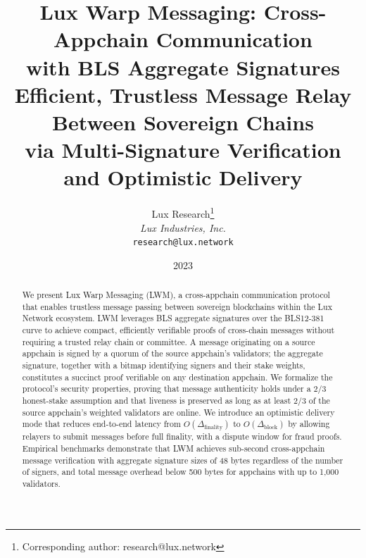 \documentclass[11pt,a4paper]{article}
\title{\textbf{Lux Warp Messaging: Cross-Appchain Communication\\with BLS Aggregate Signatures}\\[6pt]
\large Efficient, Trustless Message Relay Between Sovereign Chains\\via Multi-Signature Verification and Optimistic Delivery}
\author{
Lux Research\thanks{Corresponding author: research@lux.network}\\
\textit{Lux Industries, Inc.}\\
\texttt{research@lux.network}
}
\date{2023}
\begin{document}
\luxcoverpage

\begin{abstract}
We present Lux Warp Messaging (LWM), a cross-appchain communication protocol that enables trustless message passing between sovereign blockchains within the Lux Network ecosystem. LWM leverages BLS aggregate signatures over the BLS12-381 curve to achieve compact, efficiently verifiable proofs of cross-chain messages without requiring a trusted relay chain or committee. A message originating on a source appchain is signed by a quorum of the source appchain's validators; the aggregate signature, together with a bitmap identifying signers and their stake weights, constitutes a succinct proof verifiable on any destination appchain. We formalize the protocol's security properties, proving that message authenticity holds under a $2/3$ honest-stake assumption and that liveness is preserved as long as at least $2/3$ of the source appchain's weighted validators are online. We introduce an optimistic delivery mode that reduces end-to-end latency from $O(\Delta_{\text{finality}})$ to $O(\Delta_{\text{block}})$ by allowing relayers to submit messages before full finality, with a dispute window for fraud proofs. Empirical benchmarks demonstrate that LWM achieves sub-second cross-appchain message verification with aggregate signature sizes of 48 bytes regardless of the number of signers, and total message overhead below 500 bytes for appchains with up to 1,000 validators.
\end{abstract}















\end{document}
